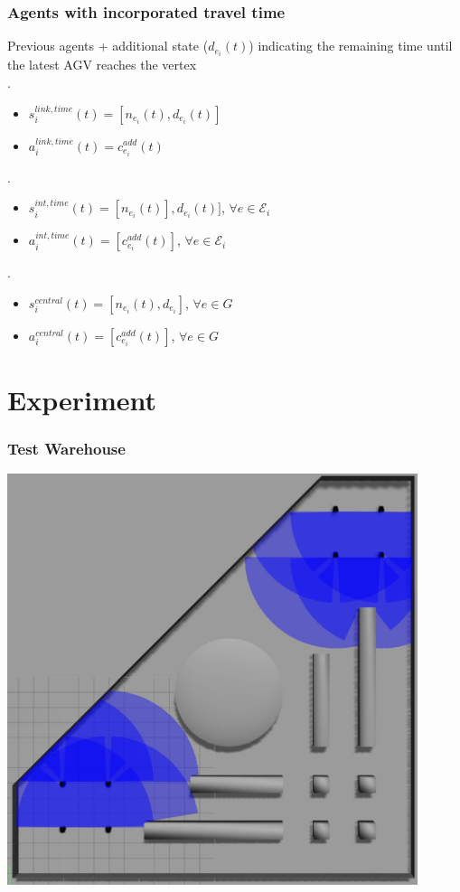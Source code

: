 \documentclass{beamer}
\begin{document}
	\begin{frame}
		\frametitle{Agents with incorporated travel time}
		Previous agents + additional state ($d_{e_i}(t)$)
		indicating the remaining time until the latest AGV reaches the vertex \\ .
		\begin{itemize}
			\item $s_i^{link,time}(t) = [n_{e_i}(t), d_{e_i}(t)]$
			\item $a_i^{link,time}(t) = c_{e_i}^{add}(t)$
		\end{itemize}
.
		\begin{itemize}
			\item $s_i^{int,time}(t) = [n_{e_i}(t)], d_{e_i}(t)]$, $\forall e \in \mathcal{E}_i$
			\item $a_i^{int,time}(t) = [c_{e_i}^{add}(t)]$, $\forall e \in \mathcal{E}_i$
		\end{itemize}
.
		\begin{itemize}
			\item $s_i^{central}(t) = [n_{e_i}(t), d_{e_i}]$, $\forall e \in G$
			\item $a_i^{central}(t) = [c_{e_i}^{add}(t)]$, $\forall e \in G$
		\end{itemize}
	\end{frame}
	\section{Experiment}
	\begin{frame}
	\frametitle{Test Warehouse}
	\begin{center}
    \includegraphics[height=0.9\textheight,width=0.9\textwidth]{exp-r.png}
    \end{center}
	\end{frame}
	
\end{document}
